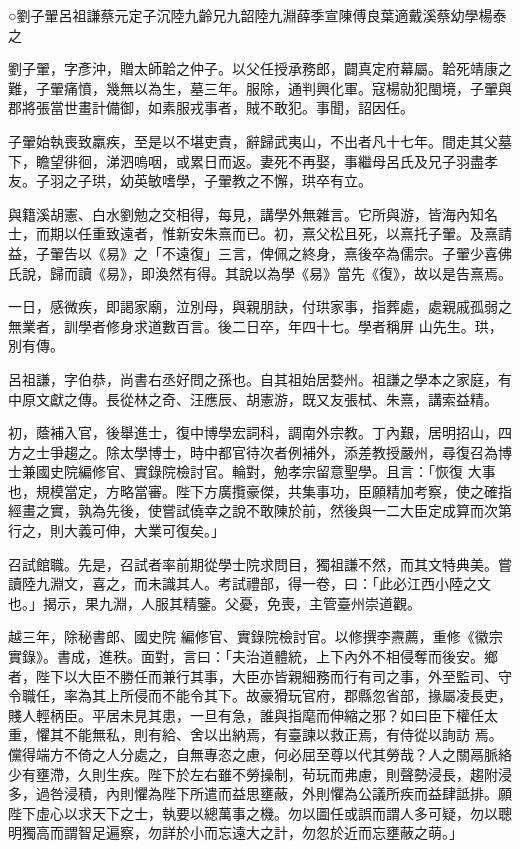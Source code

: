 
\begin{pinyinscope}

 ○劉子翬呂祖謙蔡元定子沉陸九齡兄九韶陸九淵薛季宣陳傅良葉適戴溪蔡幼學楊泰之



 劉子翬，字彥沖，贈太師韐之仲子。以父任授承務郎，闢真定府幕屬。韐死靖康之難，子翬痛憤，幾無以為生，墓三年。服除，通判興化軍。寇楊勍犯閩境，子翬與郡將張當世畫計備御，如素服戎事者，賊不敢犯。事聞，詔因任。



 子翬始執喪致羸疾，至是以不堪吏責，辭歸武夷山，不出者凡十七年。間走其父墓下，瞻望徘徊，涕泗嗚咽，或累日而返。妻死不再娶，事繼母呂氏及兄子羽盡孝友。子羽之子珙，幼英敏嗜學，子翬教之不懈，珙卒有立。



 與籍溪胡憲、白水劉勉之交相得，每見，講學外無雜言。它所與游，皆海內知名士，而期以任重致遠者，惟新安朱熹而已。初，熹父松且死，以熹托子翬。及熹請益，子翬告以《易》之「不遠復」三言，俾佩之終身，熹後卒為儒宗。子翬少喜佛氏說，歸而讀《易》，即渙然有得。其說以為學《易》當先《復》，故以是告熹焉。



 一日，感微疾，即謁家廟，泣別母，與親朋訣，付珙家事，指葬處，處親戚孤弱之無業者，訓學者修身求道數百言。後二日卒，年四十七。學者稱屏
 山先生。珙，別有傳。



 呂祖謙，字伯恭，尚書右丞好問之孫也。自其祖始居婺州。祖謙之學本之家庭，有中原文獻之傳。長從林之奇、汪應辰、胡憲游，既又友張栻、朱熹，講索益精。



 初，蔭補入官，後舉進士，復中博學宏詞科，調南外宗教。丁內艱，居明招山，四方之士爭趨之。除太學博士，時中都官待次者例補外，添差教授嚴州，尋復召為博士兼國史院編修官、實錄院檢討官。輪對，勉孝宗留意聖學。且言：「恢復
 大事也，規模當定，方略當審。陛下方廣攬豪傑，共集事功，臣願精加考察，使之確指經畫之實，孰為先後，使嘗試僥幸之說不敢陳於前，然後與一二大臣定成算而次第行之，則大義可伸，大業可復矣。」



 召試館職。先是，召試者率前期從學士院求問目，獨祖謙不然，而其文特典美。嘗讀陸九淵文，喜之，而未識其人。考試禮部，得一卷，曰：「此必江西小陸之文也。」揭示，果九淵，人服其精鑒。父憂，免喪，主管臺州崇道觀。



 越三年，除秘書郎、國史院
 編修官、實錄院檢討官。以修撰李燾薦，重修《徽宗實錄》。書成，進秩。面對，言曰：「夫治道體統，上下內外不相侵奪而後安。鄉者，陛下以大臣不勝任而兼行其事，大臣亦皆親細務而行有司之事，外至監司、守令職任，率為其上所侵而不能令其下。故豪猾玩官府，郡縣忽省部，掾屬凌長吏，賤人輕柄臣。平居未見其患，一旦有急，誰與指麾而伸縮之邪？如曰臣下權任太重，懼其不能無私，則有給、舍以出納焉，有臺諫以救正焉，有侍從以詢訪
 焉。儻得端方不倚之人分處之，自無專恣之慮，何必屈至尊以代其勞哉？人之關鬲脈絡少有壅滯，久則生疾。陛下於左右雖不勞操制，茍玩而弗慮，則聲勢浸長，趨附浸多，過咎浸積，內則懼為陛下所遣而益思壅蔽，外則懼為公議所疾而益肆詆排。願陛下虛心以求天下之士，執要以總萬事之機。勿以圖任或誤而謂人多可疑，勿以聰明獨高而謂智足遍察，勿詳於小而忘遠大之計，勿忽於近而忘壅蔽之萌。」




\end{pinyinscope}
